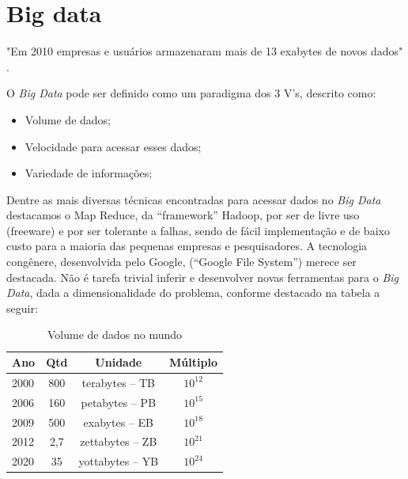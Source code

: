 \section{Big data}

"Em 2010 empresas e usuários armazenaram mais de 13 exabytes de novos dados" \cite{bigdataQualquerUm}.

O \textit{Big Data} pode ser definido como um paradigma dos 3 V’s, descrito como: 

\begin{table}[htbp]
 \begin{itemize}
   \item Volume de dados;
   \item Velocidade para acessar esses dados;
   \item Variedade de informações;
 \end{itemize}
\end{table}

  
Dentre as mais diversas técnicas encontradas para acessar dados no \textit{Big Data} destacamos o Map Reduce, da ``framework'' Hadoop, por ser de livre uso (freeware) e 
por ser tolerante a falhas, sendo de fácil implementação e de baixo custo para a maioria das pequenas empresas e pesquisadores.
A tecnologia congênere, desenvolvida pelo Google, (``Google File System'') merece ser destacada. 
Não é tarefa trivial inferir e desenvolver novas ferramentas para o \textit{Big Data}, dada a dimensionalidade do problema, conforme destacado na tabela a seguir:


\begin{table}[!ht]
\centering
\caption{Volume de dados no mundo}
\vspace{1mm}
\begin{tabular}{l|c|c|c}
\hline
\textbf{Ano} & \textbf{Qtd} & \textbf{Unidade} & \textbf{Múltiplo}\\
\hline
2000 & 800 & terabytes – TB & $10^{12}$\\
2006 & 160 & petabytes – PB & $10^{15}$\\
2009 & 500 & exabytes – EB & $10^{18}$ \\
2012 & 2,7 & zettabytes – ZB & $10^{21}$\\
2020 & 35 & yottabytes – YB & $10^{24}$\\
\end{tabular}
\end{table}

\pagebreak

